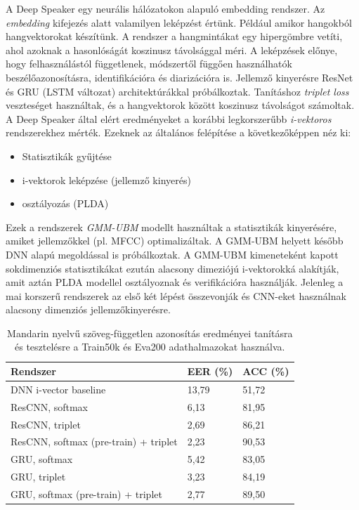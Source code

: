 A Deep Speaker egy neurális hálózatokon alapuló embedding rendszer. Az \emph{embedding} kifejezés alatt valamilyen leképzést értünk. Például amikor hangokból hangvektorokat készítünk. A rendszer a hangmintákat egy hipergömbre vetíti, ahol azoknak a hasonlóságát koszinusz távolsággal méri.
\newline
\newline
A leképzések előnye, hogy felhasználástól függetlenek, módszertől függően használhatók beszélőazonosításra, identifikációra és diarizációra is. 
\newline
\newline
Jellemző kinyerésre ResNet és GRU (LSTM változat) architektúrákkal próbálkoztak. Tanításhoz \emph{triplet loss} veszteséget használtak, és a hangvektorok között koszinusz távolságot számoltak.
\newline
\newline
A Deep Speaker által elért eredményeket a korábbi legkorszerűbb \emph{i-vektoros} rendszerekhez mérték.
Ezeknek az általános felépítése a következőképpen néz ki:
\begin{itemize}
	\item Statisztikák gyűjtése
	\item i-vektorok leképzése (jellemző kinyerés)
	\item osztályozás (PLDA)
\end{itemize} 
Ezek a rendszerek \emph{GMM-UBM} modellt használtak a statisztikák kinyerésére, amiket jellemzőkkel (pl. MFCC) optimalizáltak. A GMM-UBM helyett később
DNN alapú megoldással is próbálkoztak. A GMM-UBM kimeneteként kapott
sokdimenziós statisztikákat ezután alacsony dimeziójú i-vektorokká alakítják, amit aztán PLDA modellel osztályoznak és verifikációra használják.
Jelenleg a mai korszerű rendszerek az első két lépést összevonják és CNN-eket használnak alacsony dimenziós jellemzőkinyerésre.
\begin{table}[!ht]
	\begin{tabular}{*3l} \toprule
		\bfseries Rendszer & \bfseries EER (\%) & \bfseries ACC (\%) \\ \midrule
		DNN i-vector baseline & 13,79 & 51,72 \\
		\rowcolor{gray!10}
		ResCNN, softmax & 6,13 & 81,95 \\
		ResCNN, triplet & 2,69 & 86,21 \\
		\rowcolor{gray!10}
		ResCNN, softmax (pre-train) + triplet & 2,23 & 90,53 \\
		GRU, softmax & 5,42 & 83,05 \\
		GRU, triplet & 3,23 & 84,19 \\
		\rowcolor{gray!10}
		GRU, softmax (pre-train) + triplet & 2,77 & 89,50 \\
		\bottomrule
		\hline
	\end{tabular}
	\centering
	\caption{Mandarin nyelvű szöveg-független azonosítás eredményei tanításra és tesztelésre a Train50k és Eva200 adathalmazokat használva.}
	\label{fig:deep-speaker-independent-mandarin-results}
\end{table}

